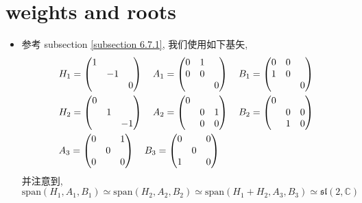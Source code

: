 \section{weights and roots}
\begin{itemize}
	\item 参考 subsection \ref{subsection 6.7.1}, 我们使用如下基矢,
	\begin{align}
		& H_1 = \begin{pmatrix}
			1 & & \\
			& - 1 & \\
			& & 0
		\end{pmatrix} \quad A_1 = \begin{pmatrix}
			0 & 1 & \\
			0 & 0 & \\
			& & 0
		\end{pmatrix} \quad B_1 = \begin{pmatrix}
			0 & 0 & \\
			1 & 0 & \\
			& & 0
		\end{pmatrix} \notag \\
		& H_2 = \begin{pmatrix}
			0 & & \\
			& 1 & \\
			& & - 1
		\end{pmatrix} \quad A_2 = \begin{pmatrix}
			0 & & \\
			& 0 & 1 \\
			& 0 & 0
		\end{pmatrix} \quad B_2 = \begin{pmatrix}
			0 & & \\
			& 0 & 0 \\
			& 1 & 0
		\end{pmatrix} \notag \\
		& A_3 = \begin{pmatrix}
			0 & & 1 \\
			& 0 & \\
			0 & & 0
		\end{pmatrix} \quad B_3 = \begin{pmatrix}
			0 & & 0 \\
			& 0 & \\
			1 & & 0
		\end{pmatrix} \label{12.1.1}
	\end{align}
	并注意到,
	\begin{equation}
		\mathrm{span}(H_1, A_1, B_1) \simeq \mathrm{span}(H_2, A_2, B_2) \simeq \mathrm{span}(H_1 + H_2, A_3, B_3) \simeq \mathfrak{sl}(2, \mathbb{C})
	\end{equation}
	

\end{itemize}
